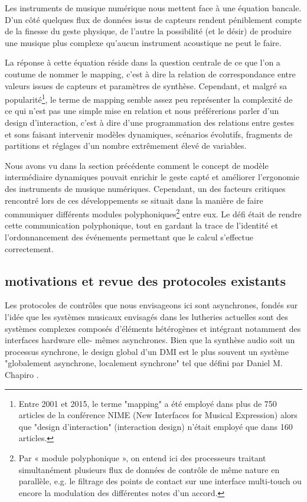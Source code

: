 Les instruments de musique numérique nous mettent face à une équation bancale. D'un côté quelques flux de données issus de capteurs rendent péniblement compte de la finesse du geste physique, de l'autre la possibilité (et le désir) de produire une musique plus complexe qu'aucun instrument acoustique ne peut le faire.

La réponse à cette équation réside dans la question centrale de ce que l'on a coutume de nommer le mapping, c'est à dire la relation de correspondance entre valeurs issues de capteurs et paramètres de synthèse. Cependant, et malgré sa popularité\footnote{ Entre 2001 et 2015, le terme "mapping" a été employé dans plus de 750 articles de la conférence NIME (New Interfaces for Musical Expression) alors que "design d'interaction" (interaction design) n'était employé que dans 160 articles.}, le terme de mapping semble assez peu représenter la complexité de ce qui n'est pas une simple mise en relation et nous préférerions parler d'un design d'interaction, c'est à dire d'une programmation des relations entre gestes et sons faisant intervenir modèles dynamiques, scénarios évolutifs, fragments de partitions et réglages d'un nombre extrêmement élevé de variables.

Nous avons vu dans la section précédente comment le concept de modèle intermédiaire dynamiques pouvait enrichir le geste capté et améliorer l’ergonomie des instruments de musique numériques. Cependant, un des facteurs critiques rencontré lors de ces développements se situait dans la manière de faire communiquer différents modules polyphoniques\footnote{ Par « module polyphonique », on entend ici des processeurs traitant simultanément plusieurs flux de données de contrôle de même nature en parallèle, e.g. le filtrage des points de contact sur une interface multi-touch ou encore la modulation des différentes notes d'un accord.} entre eux. Le défi était de rendre cette communication polyphonique, tout en gardant la trace de l'identité et l'ordonnancement des événements permettant que le calcul s'effectue correctement.

\subsection{motivations et revue des protocoles existants}

Les protocoles de contrôles que nous envisageons ici sont asynchrones, fondés sur l’idée que les systèmes musicaux envisagés dans les lutheries actuelles sont des systèmes complexes composés d’éléments hétérogènes et intégrant notamment des interfaces hardware elle- mêmes asynchrones. Bien que la synthèse audio soit un processus synchrone, le design global d'un DMI est le plus souvent un système "globalement asynchrone, localement synchrone" tel que défini par Daniel M. Chapiro \cite{chapiro_globally-asynchronous_1984}.

